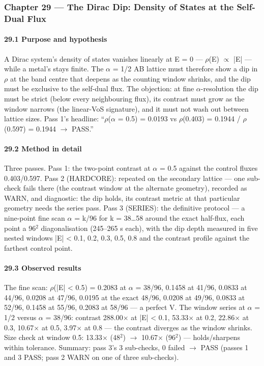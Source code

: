 \documentclass[10pt]{article}
\begin{document}
\subsubsection{Chapter 29 --- The Dirac Dip: Density of States at the Self-Dual Flux}

\paragraph{29.1 Purpose and hypothesis}

A Dirac system's density of states vanishes linearly at E = 0 --- $\rho$(E) $\propto$ |E| --- while a metal's stays finite. The $\alpha$ = 1/2 AB lattice must therefore show a dip in $\rho$ at the band centre that deepens as the counting window shrinks, and the dip must be exclusive to the self-dual flux. The objection: at fine $\alpha$-resolution the dip must be strict (below every neighbouring flux), its contrast must grow as the window narrows (the linear-VoS signature), and it must not wash out between lattice sizes. Pass 1's headline: ``$\rho$($\alpha$ = 0.5) = 0.0193 vs $\rho$(0.403) = 0.1944 / $\rho$(0.597) = 0.1944 $\rightarrow$ PASS.''

\paragraph{29.2 Method in detail}

Three passes. Pass 1: the two-point contrast at $\alpha$ = 0.5 against the control fluxes 0.403/0.597. Pass 2 (HARDCORE): repeated on the secondary lattice --- one sub-check fails there (the contrast window at the alternate geometry), recorded as WARN, and diagnostic: the dip holds, its contrast metric at that particular geometry needs the series pass. Pass 3 (SERIES): the definitive protocol --- a nine-point fine scan $\alpha$ = k/96 for k = 38\ldots{}58 around the exact half-flux, each point a 96$^2$ diagonalisation (245--265 s each), with the dip depth measured in five nested windows |E| < 0.1, 0.2, 0.3, 0.5, 0.8 and the contrast profile against the farthest control point.

\paragraph{29.3 Observed results}

The fine scan: $\rho$(|E| < 0.5) = 0.2083 at $\alpha$ = 38/96, 0.1458 at 41/96, 0.0833 at 44/96, 0.0208 at 47/96, 0.0195 at the exact 48/96, 0.0208 at 49/96, 0.0833 at 52/96, 0.1458 at 55/96, 0.2083 at 58/96 --- a perfect V. The window series at $\alpha$ = 1/2 versus $\alpha$ = 38/96: contrast 288.00$\times$ at |E| < 0.1, 53.33$\times$ at 0.2, 22.86$\times$ at 0.3, 10.67$\times$ at 0.5, 3.97$\times$ at 0.8 --- the contrast diverges as the window shrinks. Size check at window 0.5: 13.33$\times$ (48$^2$) $\rightarrow$ 10.67$\times$ (96$^2$) --- holds/sharpens within tolerance. Summary: pass 3's 3 sub-checks, 0 failed $\rightarrow$ PASS (passes 1 and 3 PASS; pass 2 WARN on one of three sub-checks).
\end{document}
